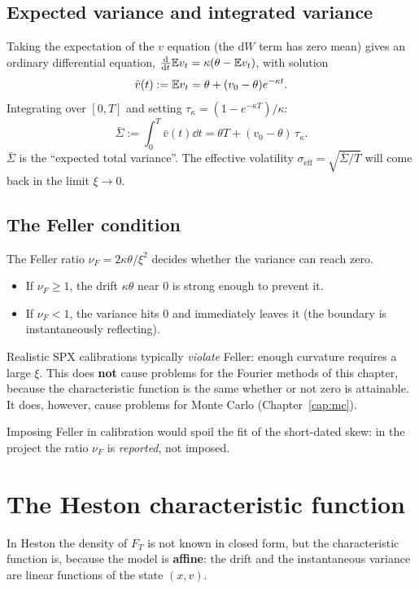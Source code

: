 \subsection{Expected variance and integrated variance}
Taking the expectation of the $v$ equation (the $\mathrm{d}W$ term has zero mean) gives an ordinary differential
equation, $\frac{\mathrm{d}}{\mathrm{d}t}\mathbb{E} v_t=\kappa(\theta-\mathbb{E} v_t)$, with solution
\begin{equation}\label{eq:var-attesa}
\bar v(t):=\mathbb{E} v_t=\theta+(v_0-\theta)e^{-\kappa t}.
\end{equation}
Integrating over $[0,T]$ and setting $\tau_\kappa=(1-e^{-\kappa T})/\kappa$:
\begin{equation}\label{eq:sigma-bar}
\bar\Sigma:=\int_0^T\bar v(t)\dd t=\theta T+(v_0-\theta)\,\tau_\kappa .
\end{equation}
$\bar\Sigma$ is the ``expected total variance''. The effective volatility $\sigma_{\text{eff}}=\sqrt{\bar\Sigma/T}$
will come back in the limit $\xi\to0$.

\subsection{The Feller condition}
The Feller ratio $\nu_F=2\kappa\theta/\xi^2$ decides whether the variance can reach zero.
\begin{itemize}
\item If $\nu_F\ge1$, the drift $\kappa\theta$ near 0 is strong enough to prevent it.
\item If $\nu_F<1$, the variance hits 0 and immediately leaves it (the boundary is instantaneously reflecting).
\end{itemize}
\begin{attenzione}
Realistic SPX calibrations typically \emph{violate} Feller: enough curvature requires a large $\xi$. This does
\textbf{not} cause problems for the Fourier methods of this chapter, because the characteristic function is the same
whether or not zero is attainable. It does, however, cause problems for Monte Carlo (Chapter~\ref{cap:mc}).

Imposing Feller in calibration would spoil the fit of the short-dated skew: in the project the ratio $\nu_F$ is
\emph{reported}, not imposed.
\end{attenzione}

\section{The Heston characteristic function}
In Heston the density of $F_T$ is not known in closed form, but the characteristic function is, because the model is
\textbf{affine}: the drift and the instantaneous variance are linear functions of the state $(x,v)$.

